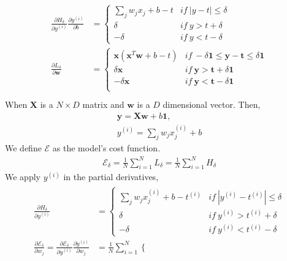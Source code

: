 \documentclass{myhw}
\begin{document}
\begin{homeworkProblem}
\begin{homeworkSection}
\begin{gather*}
\begin{aligned}
\frac{\partial H_\delta}{\partial y^{(i)}} \frac{\partial y^{(i)}}{\partial b} & = 
	\left\{ 
	\begin{array}{lr} 
	\sum_{j}{w_{j} x_{j} + b - t} & if\ |y-t| \le \delta \\ 
	\delta & if\ y > t + \delta \\
	- \delta & if\ y < t - \delta
	\end{array} \right.
\\
\frac{\partial L_\delta}{\partial \textbf{w}} & = 
	\left\{ 
	\begin{array}{lr} 
	\textbf{x}(\textbf{x}^T\textbf{w} + b - t) & if\ - \delta \textbf{1} \le \textbf{y}-\textbf{t} \le \delta \textbf{1} \\ 
	\delta \textbf{x} & if\ \textbf{y} > \textbf{t} + \delta \textbf{1} \\
	- \delta \textbf{x} & if\ \textbf{y} < \textbf{t} - \delta \textbf{1} \\
	\end{array} \right.
\\
\end{aligned}
\end{gather*}
When $\textbf{X}$ is a $N \times D$ matrix and $\textbf{w}$ is a $D$ dimensional vector. 
Then, 
\begin{gather*}
\textbf{y}=\textbf{X}\textbf{w}+b\textbf{1}, \\ y^{(i)} = \sum_j{w_j x_j^{(i)} + b}
\end{gather*}
We define $\mathscr{E}$ as the model's cost function.
\begin{gather*}
\mathscr{E}_\delta = \frac{1}{N}\sum_{i=1}^N{L_\delta} = \frac{1}{N}\sum_{i=1}^N{H_\delta}
\end{gather*}
We apply $y^{(i)}$ in the partial derivatives, 
\begin{gather*}
\begin{aligned}
\frac{\partial H_\delta}{\partial y^{(i)}} & = 
	\left\{ 
	\begin{array}{lr} 
	\sum_j{w_j x_j^{(i)} + b} - t^{(i)} & if\ |y^{(i)}-t^{(i)}| \le \delta \\ 
	\delta & if\ y^{(i)} > t^{(i)} + \delta \\
	- \delta & if\ y^{(i)} < t^{(i)} - \delta
	\end{array} \right.
\\
\frac{\partial \mathscr{E}_\delta}{\partial w_j} = 
\frac{\partial \mathscr{E}_\delta}{\partial y^{(i)}} \frac{\partial y^{(i)}}{\partial w_j} & = 
	\frac{1}{N} \sum_{i=1}^N
	\left\{ 
	\begin{array}{lr} 

\end{array}
\end{aligned}
\end{gather*}
\end{homeworkSection}
\end{homeworkProblem}
\end{document}
